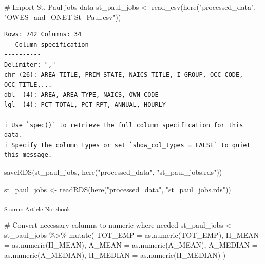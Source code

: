 \documentclass[
  letterpaper,
  DIV=11,
  numbers=noendperiod]{scrartcl}
\newenvironment{Shaded}{\begin{snugshade}}{\end{snugshade}}
\newcommand{\AttributeTok}[1]{\textcolor[rgb]{0.40,0.45,0.13}{#1}}
\newcommand{\CommentTok}[1]{\textcolor[rgb]{0.37,0.37,0.37}{#1}}
\newcommand{\FunctionTok}[1]{\textcolor[rgb]{0.28,0.35,0.67}{#1}}
\newcommand{\NormalTok}[1]{\textcolor[rgb]{0.00,0.23,0.31}{#1}}
\newcommand{\OtherTok}[1]{\textcolor[rgb]{0.00,0.23,0.31}{#1}}
\newcommand{\SpecialCharTok}[1]{\textcolor[rgb]{0.37,0.37,0.37}{#1}}
\newcommand{\StringTok}[1]{\textcolor[rgb]{0.13,0.47,0.30}{#1}}
\begin{document}
\begin{Shaded}
\begin{Highlighting}[]
\CommentTok{\# Import St. Paul jobs data}
\NormalTok{st\_paul\_jobs }\OtherTok{\textless{}{-}} \FunctionTok{read\_csv}\NormalTok{(}\FunctionTok{here}\NormalTok{(}\StringTok{"processed\_data"}\NormalTok{, }\StringTok{"OWES\_and\_ONET{-}St\_Paul.csv"}\NormalTok{))}
\end{Highlighting}
\end{Shaded}

\begin{verbatim}
Rows: 742 Columns: 34
-- Column specification --------------------------------------------------------
Delimiter: ","
chr (26): AREA_TITLE, PRIM_STATE, NAICS_TITLE, I_GROUP, OCC_CODE, OCC_TITLE,...
dbl  (4): AREA, AREA_TYPE, NAICS, OWN_CODE
lgl  (4): PCT_TOTAL, PCT_RPT, ANNUAL, HOURLY

i Use `spec()` to retrieve the full column specification for this data.
i Specify the column types or set `show_col_types = FALSE` to quiet this message.
\end{verbatim}

\begin{Shaded}
\begin{Highlighting}[]
\FunctionTok{saveRDS}\NormalTok{(st\_paul\_jobs, }\FunctionTok{here}\NormalTok{(}\StringTok{"processed\_data"}\NormalTok{, }\StringTok{"st\_paul\_jobs.rds"}\NormalTok{))}

\NormalTok{st\_paul\_jobs }\OtherTok{\textless{}{-}} \FunctionTok{readRDS}\NormalTok{(}\FunctionTok{here}\NormalTok{(}\StringTok{"processed\_data"}\NormalTok{, }\StringTok{"st\_paul\_jobs.rds"}\NormalTok{))}
\end{Highlighting}
\end{Shaded}

\textsubscript{Source:
\href{https://beeckcenter.github.io/climate-equity-workforce/index-preview.html}{Article
Notebook}}

\begin{Shaded}
\begin{Highlighting}[]
\CommentTok{\# Convert necessary columns to numeric where needed}
\NormalTok{st\_paul\_jobs }\OtherTok{\textless{}{-}}\NormalTok{ st\_paul\_jobs }\SpecialCharTok{\%\textgreater{}\%}
  \FunctionTok{mutate}\NormalTok{(}
    \AttributeTok{TOT\_EMP =} \FunctionTok{as.numeric}\NormalTok{(TOT\_EMP),}
    \AttributeTok{H\_MEAN =} \FunctionTok{as.numeric}\NormalTok{(H\_MEAN),}
    \AttributeTok{A\_MEAN =} \FunctionTok{as.numeric}\NormalTok{(A\_MEAN),}
    \AttributeTok{A\_MEDIAN =} \FunctionTok{as.numeric}\NormalTok{(A\_MEDIAN),}
    \AttributeTok{H\_MEDIAN =} \FunctionTok{as.numeric}\NormalTok{(H\_MEDIAN)}
\NormalTok{  )}
\end{Highlighting}
\end{Shaded}
\end{document}
